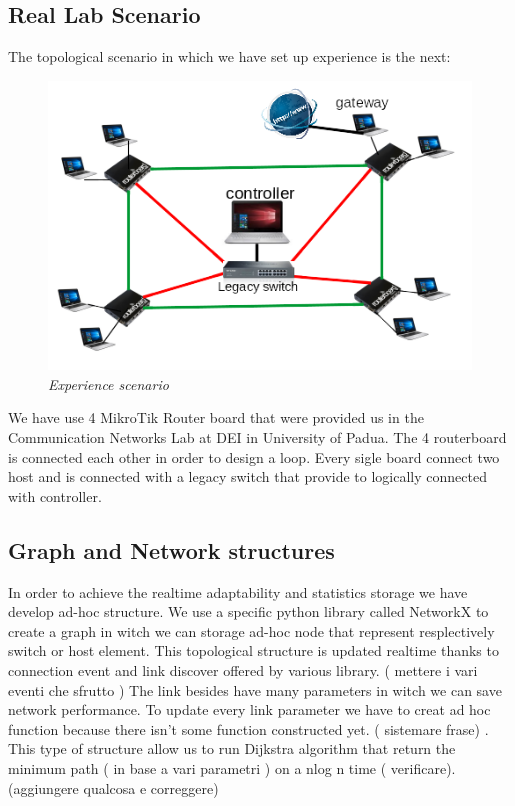 \documentclass[conference,10pt]{IEEEtran}
\begin{document}
\subsection{Real Lab Scenario}
The topological scenario in which we have set up experience is the next:
\begin{figure}[!h]
 \centering
 \includegraphics[scale=0.70]{images/topo.png}
 \caption{\emph{Experience scenario}}
 \label{fig:topo}
\end{figure}

We have use 4 MikroTik Router board that were provided us in the Communication Networks Lab at DEI in University of Padua.
The 4 routerboard is connected each other in order to design a loop. Every sigle board connect two host and is connected with a legacy switch that provide 
to logically connected with controller.

\subsection{Graph and Network structures}
  In order to achieve the realtime adaptability and statistics storage we have develop ad-hoc structure.
  We use a specific python library called NetworkX \cite{networkx} to create a graph in witch we can storage ad-hoc node that represent
  resplectively switch or host element.
  This topological structure is updated realtime thanks to connection event and link discover offered by various library.
  ( mettere i vari eventi che sfrutto )
  The link besides have many parameters in witch we can save network performance. To update every link parameter we have to creat ad hoc function
  because there isn't some function constructed yet. ( sistemare frase) .
  This type of structure allow us to run Dijkstra algorithm that return the minimum path ( in base a vari parametri ) on a nlog n time ( verificare).
  (aggiungere qualcosa e correggere)
  
\end{document}
